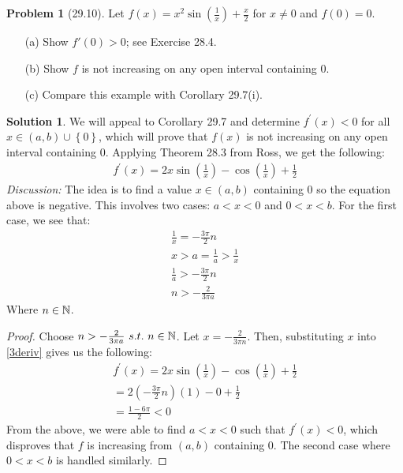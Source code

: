 \documentclass[12pt]{article}
\theoremstyle{definition} %
\newtheorem{solution}{Solution}
\newtheorem{problem}{Problem}
\theoremstyle{plain} %
\begin{document}
\begin{problem}[29.10]
    Let $ f(x) = x^2 \sin\left(\frac{1}{x}\right) + \frac{x}{2} $ for $ x \neq 0 $ and $ f(0) = 0 $.

\begin{enumerate}
    \item[(a)] Show $ f'(0) > 0 $; see Exercise 28.4.
    \item[(b)] Show $ f $ is not increasing on any open interval containing 0.
    \item[(c)] Compare this example with Corollary 29.7(i).
\end{enumerate}
\end{problem}
\begin{solution}
   We will appeal to Corollary 29.7 and determine $f^\prime (x)<0$ for all $x\in (a,b)\cup \left\{ 0 \right\}$, which will prove that $f(x)$ is not increasing on any open interval containing $0$. Applying Theorem 28.3 from Ross, we get the following:
   \begin{align}
    f^\prime (x)=2x\sin \left( \frac{1}{x} \right) -\cos\left( \frac{1}{x} \right) +\frac{1}{2} \label{3deriv}
   \end{align} 
\emph{Discussion:} The idea is to find a value $x \in (a,b)$ containing $0$ so the equation above is negative. This involves two cases: $a<x<0$ and $0<x<b$. For the first case, we see that:
\begin{align}
    \frac{1}{x} = -\frac{3\pi}{2}n \\[10pt]
    x>a = \frac{1}{a}>\frac{1}{x} \\[10pt] 
    \frac{1}{a}> -\frac{3\pi}{2}n \\[10pt] 
    n > -\frac{2}{3\pi a}
\end{align}
Where $n\in \mathbb{\MakeUppercase{n}} $. 
\begin{proof}
    Choose $n> -\frac{2}{3\pi a} \ s.t. \ n\in \mathbb{\MakeUppercase{n}} $. Let $x = -\frac{2}{3\pi n}$. Then, substituting $x$ into \autoref{3deriv} gives us the following:
    \begin{align}
        f^\prime (x)=2x\sin \left( \frac{1}{x} \right) -\cos\left( \frac{1}{x} \right) +\frac{1}{2} \\[10pt] 
        = 2\left( -\frac{3\pi}{2}n \right)\left( 1 \right) - 0 + \frac{1}{2}  \\[10pt] 
        = \frac{1-6\pi}{2}<0
    \end{align}
    From the above, we were able to find $a<x<0$ such that $f^\prime (x)<0$, which disproves that $f$ is increasing from $(a,b)$ containing $0$. The second case where $0<x<b$ is handled similarly.
\end{proof}
\end{solution}
\end{document}
